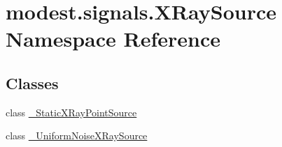 \hypertarget{namespacemodest_1_1signals_1_1XRaySource}{}\section{modest.\+signals.\+X\+Ray\+Source Namespace Reference}
\label{namespacemodest_1_1signals_1_1XRaySource}
\subsection*{Classes}
\begin{DoxyCompactItemize}
\item 
class \hyperlink{classmodest_1_1signals_1_1XRaySource_1_1__StaticXRayPointSource}{\+\_\+\+Static\+X\+Ray\+Point\+Source}
\item 
class \hyperlink{classmodest_1_1signals_1_1XRaySource_1_1__UniformNoiseXRaySource}{\+\_\+\+Uniform\+Noise\+X\+Ray\+Source}
\end{DoxyCompactItemize}
